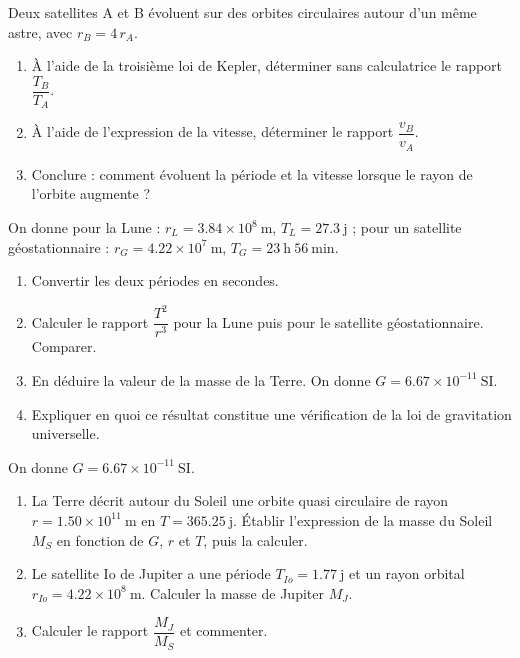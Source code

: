 \documentclass[11pt]{article}
\newcounter{popsec}
\newcounter{popsub}
\newcommand{\courssub}[1]{%
  \stepcounter{popsub}%
  \par\vspace{9pt}\noindent{\popxbold\fontsize{11.5}{13}\selectfont\color{popink}{\color{poporange}\thepopsec.\thepopsub}\hspace{6pt}#1}\par\nopagebreak\vspace{4pt}
}
\begin{document}
\courssub{Je m'entraîne}

\begin{exercice}
Deux satellites A et B évoluent sur des orbites circulaires autour d'un même astre, avec $r_B = 4\,r_A$.
\begin{enumerate}
\item À l'aide de la troisième loi de Kepler, déterminer sans calculatrice le rapport $\dfrac{T_B}{T_A}$.
\item À l'aide de l'expression de la vitesse, déterminer le rapport $\dfrac{v_B}{v_A}$.
\item Conclure : comment évoluent la période et la vitesse lorsque le rayon de l'orbite augmente ?
\end{enumerate}
\end{exercice}

\begin{exercice}
On donne pour la Lune : $r_L = \num{3,84}\times 10^{8}\ \mathrm{m}$, $T_L = \num{27,3}\ \mathrm{j}$ ; pour un satellite géostationnaire : $r_G = \num{4,22}\times 10^{7}\ \mathrm{m}$, $T_G = \num{23}\ \mathrm{h}\ \num{56}\ \mathrm{min}$.
\begin{enumerate}
\item Convertir les deux périodes en secondes.
\item Calculer le rapport $\dfrac{T^2}{r^3}$ pour la Lune puis pour le satellite géostationnaire. Comparer.
\item En déduire la valeur de la masse de la Terre. On donne $G = \num{6,67}\times 10^{-11}\ \mathrm{SI}$.
\item Expliquer en quoi ce résultat constitue une vérification de la loi de gravitation universelle.
\end{enumerate}
\end{exercice}

\begin{exercice}
On donne $G = \num{6,67}\times 10^{-11}\ \mathrm{SI}$.
\begin{enumerate}
\item La Terre décrit autour du Soleil une orbite quasi circulaire de rayon $r = \num{1,50}\times 10^{11}\ \mathrm{m}$ en $T = \num{365,25}\ \mathrm{j}$. Établir l'expression de la masse du Soleil $M_S$ en fonction de $G$, $r$ et $T$, puis la calculer.
\item Le satellite Io de Jupiter a une période $T_{Io} = \num{1,77}\ \mathrm{j}$ et un rayon orbital $r_{Io} = \num{4,22}\times 10^{8}\ \mathrm{m}$. Calculer la masse de Jupiter $M_J$.
\item Calculer le rapport $\dfrac{M_J}{M_S}$ et commenter.
\end{enumerate}
\end{exercice}
\end{document}
